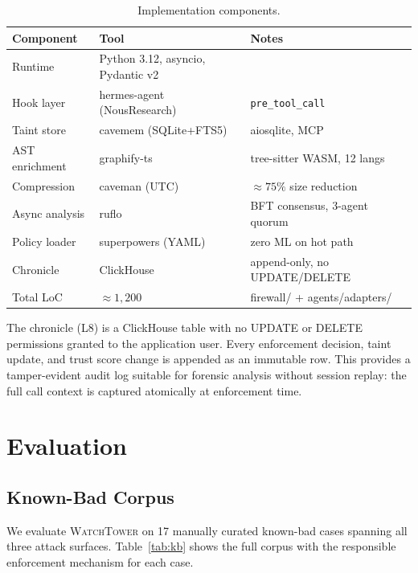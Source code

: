 \documentclass[conference]{IEEEtran}
\begin{document}
\begin{table}[t]
\centering
\caption{Implementation components.}
\label{tab:impl}
\begin{tabular}{lll}
\toprule
Component & Tool & Notes \\
\midrule
Runtime        & Python 3.12, asyncio, Pydantic v2 & \\
Hook layer     & hermes-agent (NousResearch)        & \texttt{pre\_tool\_call} \\
Taint store    & cavemem (SQLite+FTS5)              & aiosqlite, MCP \\
AST enrichment & graphify-ts                        & tree-sitter WASM, 12 langs \\
Compression    & caveman (UTC)                      & ${\approx}75\%$ size reduction \\
Async analysis & ruflo                              & BFT consensus, 3-agent quorum \\
Policy loader  & superpowers (YAML)                 & zero ML on hot path \\
Chronicle      & ClickHouse                         & append-only, no UPDATE/DELETE \\
Total LoC      & ${\approx}1{,}200$                 & firewall/ + agents/adapters/ \\
\bottomrule
\end{tabular}
\end{table}

The chronicle (L8) is a ClickHouse table with no UPDATE or DELETE
permissions granted to the application user. Every enforcement decision,
taint update, and trust score change is appended as an immutable row.
This provides a tamper-evident audit log suitable for forensic analysis
without session replay: the full call context is captured atomically at
enforcement time.

\section{Evaluation}
\label{sec:eval}

\subsection{Known-Bad Corpus}

We evaluate \textsc{WatchTower} on 17 manually curated known-bad cases
spanning all three attack surfaces. Table~\ref{tab:kb} shows the full
corpus with the responsible enforcement mechanism for each case.
\end{document}
